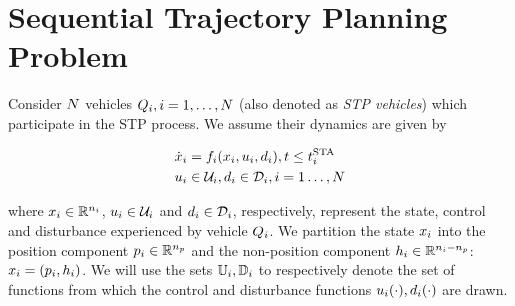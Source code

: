\section{Sequential Trajectory Planning Problem \label{sec:formulation}}
Consider $N$ vehicles $Q_i, i = 1, \ldots, N$ (also denoted as \textit{STP vehicles}) which participate in the STP process. We assume their dynamics are given by %

\begin{equation}
\label{eq:dyn}
\begin{aligned}
\dot\state_i &= \fdyn_i(\state_i, \ctrl_i, \dstb_i), t \le \sta_i \\
\ctrl_i &\in \cset_i, \dstb_i \in \dset_i, i = 1 \ldots, \N
\end{aligned}
\end{equation}

\noindent where $x_i \in \mathbb{R}^{n_i}$, $u_i \in \mathcal{U}_i$ and $d_i \in \mathcal{D}_i$, respectively, represent the state, control and disturbance experienced by vehicle $Q_i$. We partition the state $x_i$ into the position component $p_i \in \mathbb{R}^{n_p}$ and the non-position component $h_i \in \mathbb{R}^{n_i - n_p}$: $x_i = (p_i, h_i)$. %
We will use the sets $\mathbb{U}_i, \mathbb{D}_i$ to respectively denote the set of functions from which the control and disturbance functions $u_i(\cdot), d_i(\cdot)$ are drawn.



